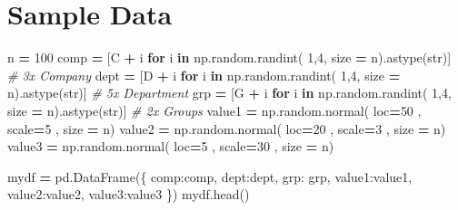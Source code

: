 \documentclass[
]{book}
\newenvironment{Shaded}{\begin{snugshade}}{\end{snugshade}}
\newcommand{\BuiltInTok}[1]{#1}
\newcommand{\CommentTok}[1]{\textcolor[rgb]{0.37,0.37,0.37}{\textit{#1}}}
\newcommand{\ControlFlowTok}[1]{\textcolor[rgb]{0.27,0.27,0.27}{\textbf{#1}}}
\newcommand{\DecValTok}[1]{\textcolor[rgb]{0.06,0.06,0.06}{#1}}
\newcommand{\KeywordTok}[1]{\textcolor[rgb]{0.27,0.27,0.27}{\textbf{#1}}}
\newcommand{\NormalTok}[1]{#1}
\newcommand{\OperatorTok}[1]{\textcolor[rgb]{0.43,0.43,0.43}{\textbf{#1}}}
\newcommand{\StringTok}[1]{\textcolor[rgb]{0.5,0.5,0.5}{#1}}
\begin{document}
\hypertarget{sample-data-19}{%
\section{Sample Data}\label{sample-data-19}}

\begin{Shaded}
\begin{Highlighting}[]
\NormalTok{n }\OperatorTok{=} \DecValTok{100}
\NormalTok{comp }\OperatorTok{=}\NormalTok{ [}\StringTok{\textquotesingle{}C\textquotesingle{}} \OperatorTok{+}\NormalTok{ i }\ControlFlowTok{for}\NormalTok{ i }\KeywordTok{in}\NormalTok{ np.random.randint( }\DecValTok{1}\NormalTok{,}\DecValTok{4}\NormalTok{, size  }\OperatorTok{=}\NormalTok{ n).astype(}\BuiltInTok{str}\NormalTok{)] }\CommentTok{\# 3x Company}
\NormalTok{dept }\OperatorTok{=}\NormalTok{ [}\StringTok{\textquotesingle{}D\textquotesingle{}} \OperatorTok{+}\NormalTok{ i }\ControlFlowTok{for}\NormalTok{ i }\KeywordTok{in}\NormalTok{ np.random.randint( }\DecValTok{1}\NormalTok{,}\DecValTok{4}\NormalTok{, size  }\OperatorTok{=}\NormalTok{ n).astype(}\BuiltInTok{str}\NormalTok{)] }\CommentTok{\# 5x Department}
\NormalTok{grp }\OperatorTok{=}\NormalTok{  [}\StringTok{\textquotesingle{}G\textquotesingle{}} \OperatorTok{+}\NormalTok{ i }\ControlFlowTok{for}\NormalTok{ i }\KeywordTok{in}\NormalTok{ np.random.randint( }\DecValTok{1}\NormalTok{,}\DecValTok{4}\NormalTok{, size  }\OperatorTok{=}\NormalTok{ n).astype(}\BuiltInTok{str}\NormalTok{)] }\CommentTok{\# 2x Groups}
\NormalTok{value1 }\OperatorTok{=}\NormalTok{ np.random.normal( loc}\OperatorTok{=}\DecValTok{50}\NormalTok{ , scale}\OperatorTok{=}\DecValTok{5}\NormalTok{ , size }\OperatorTok{=}\NormalTok{ n)}
\NormalTok{value2 }\OperatorTok{=}\NormalTok{ np.random.normal( loc}\OperatorTok{=}\DecValTok{20}\NormalTok{ , scale}\OperatorTok{=}\DecValTok{3}\NormalTok{ , size }\OperatorTok{=}\NormalTok{ n)}
\NormalTok{value3 }\OperatorTok{=}\NormalTok{ np.random.normal( loc}\OperatorTok{=}\DecValTok{5}\NormalTok{ , scale}\OperatorTok{=}\DecValTok{30}\NormalTok{ , size }\OperatorTok{=}\NormalTok{ n)}

\NormalTok{mydf }\OperatorTok{=}\NormalTok{ pd.DataFrame(\{}
    \StringTok{\textquotesingle{}comp\textquotesingle{}}\NormalTok{:comp, }
    \StringTok{\textquotesingle{}dept\textquotesingle{}}\NormalTok{:dept, }
    \StringTok{\textquotesingle{}grp\textquotesingle{}}\NormalTok{: grp,}
    \StringTok{\textquotesingle{}value1\textquotesingle{}}\NormalTok{:value1, }
    \StringTok{\textquotesingle{}value2\textquotesingle{}}\NormalTok{:value2,}
    \StringTok{\textquotesingle{}value3\textquotesingle{}}\NormalTok{:value3 }
\NormalTok{\})}
\NormalTok{mydf.head()}
\end{Highlighting}
\end{Shaded}
\end{document}
